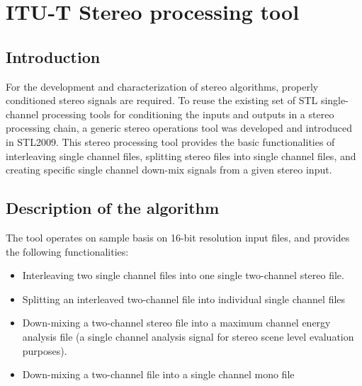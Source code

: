 % 
\chapter{ITU-T Stereo processing tool}

\section{Introduction}

For the development and characterization of stereo algorithms,
properly conditioned stereo signals are required. To reuse the
existing set of STL single-channel processing tools for conditioning
the inputs and outputs in a stereo processing chain, a generic stereo
operations tool was developed and introduced in STL2009. This stereo
processing tool provides the basic functionalities of interleaving
single channel files, splitting stereo files into single channel
files, and creating specific single channel down-mix signals from a
given stereo input.

\section{Description of the algorithm}

The tool operates on sample basis on 16-bit resolution input files,
and provides the following functionalities:

\begin{itemize}
\item Interleaving two single channel files into one single
  two-channel stereo file.
\item Splitting an interleaved two-channel file into individual single
  channel files 
\item Down-mixing a two-channel stereo file into a maximum channel
  energy analysis file (a single channel analysis signal for stereo
  scene level evaluation purposes).
\item Down-mixing a two-channel file into a single channel mono file
\end{itemize}

